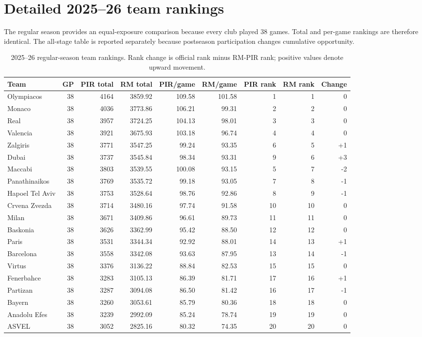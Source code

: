 \documentclass[pdflatex,sn-mathphys-num]{sn-jnl}
\begin{document}
\section{Detailed 2025--26 team rankings}

The regular season provides an equal-exposure comparison because every club played 38 games. Total and per-game rankings are therefore identical. The all-stage table is reported separately because postseason participation changes cumulative opportunity.

\begin{table}[t]
\caption{2025--26 regular-season team rankings. Rank change is official rank minus RM-PIR rank; positive values denote upward movement.}
\label{tab:s-team-regular}
\centering
\tiny
\setlength{\tabcolsep}{1.5pt}
\begin{tabular}{@{}lrrrrrrrr@{}}
\toprule
Team & GP & PIR total & RM total & PIR/game & RM/game & PIR rank & RM rank & Change \\
\midrule
Olympiacos & 38 & 4164 & 3859.92 & 109.58 & 101.58 & 1 & 1 & 0 \\
Monaco & 38 & 4036 & 3773.86 & 106.21 & 99.31 & 2 & 2 & 0 \\
Real & 38 & 3957 & 3724.25 & 104.13 & 98.01 & 3 & 3 & 0 \\
Valencia & 38 & 3921 & 3675.93 & 103.18 & 96.74 & 4 & 4 & 0 \\
Zalgiris & 38 & 3771 & 3547.25 & 99.24 & 93.35 & 6 & 5 & +1 \\
Dubai & 38 & 3737 & 3545.84 & 98.34 & 93.31 & 9 & 6 & +3 \\
Maccabi & 38 & 3803 & 3539.55 & 100.08 & 93.15 & 5 & 7 & -2 \\
Panathinaikos & 38 & 3769 & 3535.72 & 99.18 & 93.05 & 7 & 8 & -1 \\
Hapoel Tel Aviv & 38 & 3753 & 3528.64 & 98.76 & 92.86 & 8 & 9 & -1 \\
Crvena Zvezda & 38 & 3714 & 3480.16 & 97.74 & 91.58 & 10 & 10 & 0 \\
Milan & 38 & 3671 & 3409.86 & 96.61 & 89.73 & 11 & 11 & 0 \\
Baskonia & 38 & 3626 & 3362.99 & 95.42 & 88.50 & 12 & 12 & 0 \\
Paris & 38 & 3531 & 3344.34 & 92.92 & 88.01 & 14 & 13 & +1 \\
Barcelona & 38 & 3558 & 3342.08 & 93.63 & 87.95 & 13 & 14 & -1 \\
Virtus & 38 & 3376 & 3136.22 & 88.84 & 82.53 & 15 & 15 & 0 \\
Fenerbahce & 38 & 3283 & 3105.13 & 86.39 & 81.71 & 17 & 16 & +1 \\
Partizan & 38 & 3287 & 3094.08 & 86.50 & 81.42 & 16 & 17 & -1 \\
Bayern & 38 & 3260 & 3053.61 & 85.79 & 80.36 & 18 & 18 & 0 \\
Anadolu Efes & 38 & 3239 & 2992.09 & 85.24 & 78.74 & 19 & 19 & 0 \\
ASVEL & 38 & 3052 & 2825.16 & 80.32 & 74.35 & 20 & 20 & 0 \\
\bottomrule
\end{tabular}
\end{table}
\end{document}
